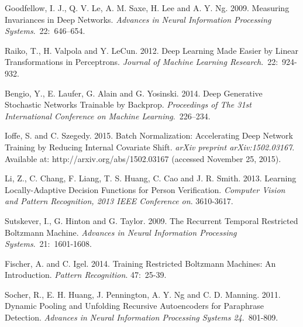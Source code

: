 \documentclass[12pt]{article}
\begin{document}
\begin{thebibliography}{10}
{Goodfellow, I. J., Q. V. Le, A. M. Saxe, H. Lee and A. Y. Ng.}
2009. Measuring Invariances in Deep Networks. \emph{Advances in Neural Information Processing Systems}.~22:~646--654.


{Raiko, T., H. Valpola and Y. LeCun.}
2012. Deep Learning Made Easier by Linear Transformations in
Perceptrons. \emph{Journal of Machine Learning Research}.~22:~924-932.

{Bengio, Y., E. Laufer, G. Alain and G. Yosinski. }
2014. Deep Generative Stochastic Networks Trainable by Backprop. \emph{Proceedings of The 31st International Conference on Machine Learning}.~226–234.


{Ioffe, S. and C. Szegedy.}
2015. Batch Normalization: Accelerating Deep Network Training by Reducing Internal Covariate Shift. \emph{arXiv preprint arXiv:1502.03167}. Available at: http://arxiv.org/abs/1502.03167 (accessed November 25, 2015).

{Li, Z., C. Chang, F. Liang, T. S. Huang, C. Cao and J. R. Smith.}
2013. Learning Locally-Adaptive Decision Functions for Person Verification. \emph{Computer Vision and Pattern Recognition, 2013 IEEE Conference on}. 3610-3617.

{Sutskever, I., G. Hinton and G. Taylor.}
2009. The Recurrent Temporal Restricted Boltzmann
Machine. \emph{Advances in Neural Information Processing Systems}.~21:~1601-1608.

 {Fischer, A. and C. Igel.}
2014. Training Restricted Boltzmann Machines: An Introduction. \emph{Pattern Recognition}. 47:~25-39.

{Socher, R., E. H. Huang, J. Pennington, A. Y. Ng and C. D. Manning. }
2011. Dynamic Pooling and Unfolding Recursive Autoencoders for Paraphrase Detection. \emph{Advances in Neural Information Processing Systems 24}.~801-809.




\end{thebibliography}
\end{document}
